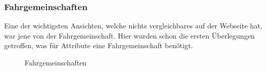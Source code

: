 \subsubsection{Fahrgemeinschaften}\label{mockups_carpools}
Eine der wichtigsten Ansichten, welche nichts vergleichbares auf der Webseite hat, war jene von der Fahrgemeinschaft. Hier wurden schon die ersten Überlegungen getroffen, was für Attribute eine Fahrgemeinschaft benötigt.
\begin{figure}[ht]
\centering
{}
\label{fig:mockup_carpool}
\caption{Fahrgemeinschaften}
\end{figure}

